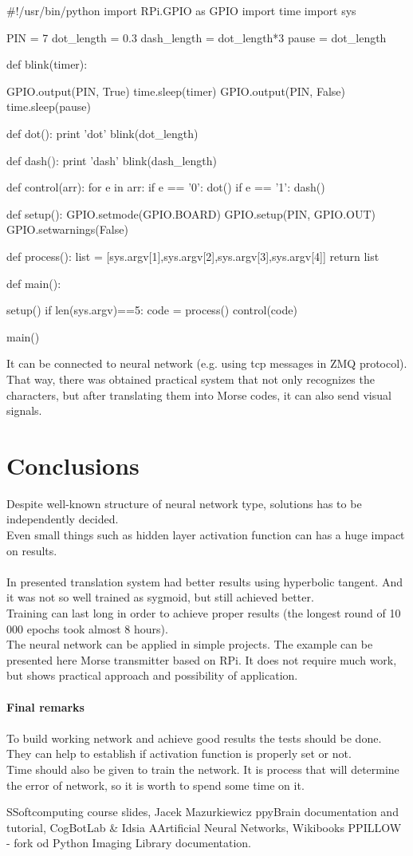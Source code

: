 \documentclass[eng,openany]{mgr}
\begin{document}
\begin{python}

#!/usr/bin/python
import RPi.GPIO as GPIO
import time
import sys

PIN = 7
dot_length = 0.3
dash_length = dot_length*3
pause = dot_length

def blink(timer):
	
	GPIO.output(PIN, True) 
	time.sleep(timer)
	GPIO.output(PIN, False) 
	time.sleep(pause)

def dot():
	print 'dot'
	blink(dot_length)
	
def dash():
	print 'dash'
	blink(dash_length)
	
def control(arr):
	for e in arr:
		if e == '0':
			dot()
		if e == '1':
			dash()

def setup():
	GPIO.setmode(GPIO.BOARD)
	GPIO.setup(PIN, GPIO.OUT)	
	GPIO.setwarnings(False)

def process():
	list = [sys.argv[1],sys.argv[2],sys.argv[3],sys.argv[4]]
	return list	
	
def main():
	
	setup()	
	if len(sys.argv)==5:
		code = process()
		control(code)

main()

\end{python}
It can be connected to neural network (e.g. using tcp messages in ZMQ protocol).\\
That way, there was obtained practical system that not only recognizes the characters, but after translating them into Morse codes, it can also send visual signals.
\chapter{Conclusions}
Despite well-known structure of neural network type, solutions has to be independently decided.\\Even small things such as hidden layer activation function can has a huge impact on results.
\\
\\
In presented translation system had better results using hyperbolic tangent. And it was not so well trained as sygmoid, but still achieved better.
\\
Training can last long in order to achieve proper results (the longest round of 10 000 epochs took almost 8 hours).
\\
The neural network can be applied in simple projects. The example can be presented here Morse transmitter based on RPi. It does not require much work, but shows practical approach and possibility of application.
\\
\\
\textbf{Final remarks}\\\\
To build working network and achieve good results the tests should be done. They can help to establish if activation function is properly set or not.
\\
Time should also be given to train the network. It is process that will determine the error of network, so it is worth to spend some time on it.

\begin{thebibliography}{}
\bibitem SSoftcomputing course slides, Jacek Mazurkiewicz
\bibitem ppyBrain documentation and tutorial, CogBotLab \& Idsia
\bibitem AArtificial Neural Networks, Wikibooks
\bibitem PPILLOW - fork od Python Imaging Library documentation.
\end{thebibliography}
\end{document}
